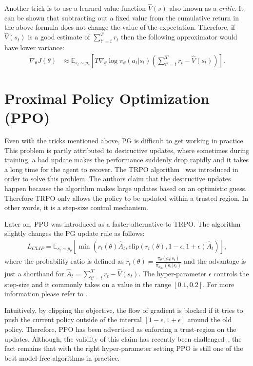 Another trick is to use a learned value function $\hat{V}(s)$ also known as a \textit{critic}. It can be shown that subtracting out a fixed value from the cumulative return in the above formula does not change the value of the expectation. Therefore, if $\hat{V}(s_t)$ is a good estimate of $\sum_{t'=t}^T r_t$ then the following approximator would have lower variance:
\begin{align}
    \nabla_\theta J(\theta) &\approx \mathbb{E}_{s_t \sim p_\theta} \left[T \nabla_\theta \log \pi_\theta(a_t|s_t) \left( \sum_{t'=t}^T r_t - \hat{V}(s_t) \right) \right].
\end{align}

\section{Proximal Policy Optimization (PPO)}

Even with the tricks mentioned above, \ac{PG} is difficult to get working in practice.
This problem is partly attributed to destructive updates, where sometimes during training, a bad update makes the performance suddenly drop rapidly and it takes a long time for the agent to recover.
The \ac{TRPO} algorithm~\cite{trpo} was introduced in order to solve this problem.
The authors claim that the destructive updates happen because the algorithm makes large updates based on an optimistic guess.
Therefore \ac{TRPO} only allows the policy to be updated within a trusted region.
In other words, it is a step-size control mechanism.

Later on, \ac{PPO} was introduced as a faster alternative to \ac{TRPO}. The algorithm slightly changes the \ac{PG} update rule as follows:
\begin{align}
    L_{CLIP} = \mathbb{E}_{s_t \sim p_\theta} \left[ \min \left(r_t(\theta) \hat{A}_t, \text{clip}(r_t(\theta), 1-\epsilon, 1+\epsilon) \hat{A}_t\right) \right],
\end{align}
where the probability ratio is defined as $r_t(\theta) = \frac{\pi_\theta(a_t|s_t)}{\pi_{\theta_{old}}(a_t|s_t)}$ and the advantage is just a shorthand for $\hat{A}_t = \sum_{t'=t}^T r_t - \hat{V}(s_t)$. The hyper-parameter $\epsilon$ controls the step-size and it commonly takes on a value in the range $[0.1,0.2]$. For more information please refer to \cite{ppo}.

Intuitively, by clipping the objective, the flow of gradient is blocked if it tries to push the current policy outside of the interval $[1-\epsilon, 1+\epsilon]$ around the old policy. Therefore, \ac{PPO} has been advertised as enforcing a trust-region on the updates.  Although, the validity of this claim has recently been challenged~\cite{truly_pg}, the fact remains that with the right hyper-parameter setting \ac{PPO} is still one of the best model-free algorithms in practice.
